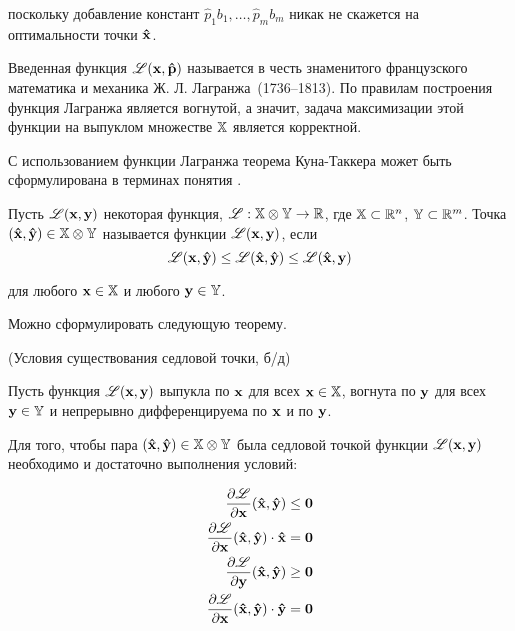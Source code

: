 \noindent поскольку добавление констант $\hat p_1 b_1, \ldots, \hat
p_m b_m$ никак не скажется на оптимальности точки $\mathbf{\hat x}$.

Введенная функция $\mathscr{L}(\mathbf{x},\mathbf{\hat p})$ называется  \/ в честь знаменитого французского математика и механика
Ж. Л. Лагран\-жа~(1736--1813). По правилам построения функция
Лагранжа является вогнутой, а значит, задача максимизации этой
функции на выпуклом множестве $\mathbb{X}$ является корректной.

С использованием функции Лагранжа теорема Куна-Таккера может быть
сформулирована в терминах понятия .


\begin{dfn}
Пусть $\mathscr{L}(\mathbf{x}, \mathbf{y})$ некоторая функция, $\mathscr{L}: \mathbb{X}
\otimes \mathbb{Y} \rightarrow \mathbb{R}$, где $\mathbb{X} \subset \mathbb{R}^n$, $\mathbb{Y}
\subset \mathbb{R}^m$. Точка $(\mathbf{\hat x}, \mathbf{\hat y}) \in \mathbb{X} \otimes
\mathbb{Y}$ называется  функции $\mathscr{L}(\mathbf{x},
\mathbf{y})$, если
\[
\mathscr{L}(\mathbf{x}, \mathbf{\hat y}) \leq \mathscr{L}(\mathbf{\hat x}, \mathbf{\hat y}) \leq
\mathscr{L}(\mathbf{\hat x}, \mathbf{y})
\]

\noindent для любого $\mathbf{x} \in \mathbb{X}$ и любого $\mathbf{y} \in
\mathbb{Y}$.

\end{dfn}


Можно сформулировать следующую теорему.

\begin{teop}(Условия существования седловой точки, б/д)

Пусть функция $\mathscr{L}(\mathbf{x}, \mathbf{y})$ выпукла по $\mathbf{x}$ для всех
$\mathbf{x} \in \mathbb{X}$, вогнута по $\mathbf{y}$ для всех $\mathbf{y} \in
\mathbb{Y}$ и непрерывно дифференцируема по $\mathbf{x}$ и по $\mathbf{y}$.

Для того, чтобы пара $(\mathbf{\hat x}, \mathbf{\hat y}) \in \mathbb{X} \otimes
\mathbb{Y}$ была седловой точкой функции $\mathscr{L}(\mathbf{x}, \mathbf{y})$
необходимо и достаточно выполнения условий:

\begin{align}
\frac{\partial \mathscr{L}}{\partial \mathbf{x}}(\mathbf{\hat x}, \mathbf{\hat y}) &
\leq \mathbf{0}\\
\frac{\partial \mathscr{L}}{\partial \mathbf{x}}(\mathbf{\hat x}, \mathbf{\hat y})
\cdot \mathbf{\hat x} & = \mathbf{0}\\
\frac{\partial \mathscr{L}}{\partial \mathbf{y}}(\mathbf{\hat x}, \mathbf{\hat y}) &
\geq \mathbf{0}\\
\frac{\partial \mathscr{L}}{\partial \mathbf{x}}(\mathbf{\hat x}, \mathbf{\hat y})
\cdot \mathbf{\hat y} & = \mathbf{0}
\end{align}


\end{teop}


